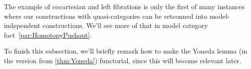 The example of cocartesian and left fibrations is only the first of many instances where our constructions with quasi-categories can be retconned into model-independent constructions. We'll see more of that in model category fact~\cref{par:HomotopyPushout}.

To finish this subsection, we'll briefly remark how to make the Yoneda lemma (in the version from \cref{thm:Yoneda}) functorial, since this will become relevant later.


